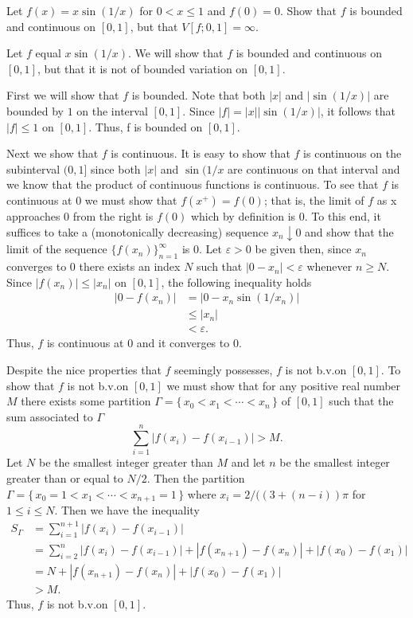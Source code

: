 \begin{problem}
  Let \(f(x)=x\sin(1/x)\) for \(0<x\leq 1\) and \(f(0)=0\). Show that \(f\) is
  bounded and continuous on \([0,1]\), but that \(V[f;0,1]=\infty\).
\end{problem}
\begin{solution}
  Let \(f\) equal \(x\sin(1/x)\). We will show that \(f\) is bounded and
  continuous on \([0,1]\), but that it is not of bounded variation on
  \([0,1]\).

  First we will show that \(f\) is bounded. Note that both \(|x|\) and
  \(|\sin(1/x)|\) are bounded by \(1\) on the interval \([0,1]\). Since
  \(|f|=|x||\sin(1/x)|\), it follows that \(|f|\leq 1\) on \([0,1]\). Thus, \(\)f
  is bounded on \([0,1]\).

  Next we show that \(f\) is continuous. It is easy to show that \(f\) is
  continuous on the subinterval \((0,1]\) since both \(|x|\) and \(\sin(1/x\)
  are continuous on that interval and we know that the product of
  continuous functions is continuous. To see that \(f\) is continuous at \(\)0
  we must show that \(f(x^+)=f(0)\); that is, the limit of \(f\) as \(\)x
  approaches \(0\) from the right is \(f(0)\) which by definition is \(0\). To
  this end, it suffices to take a (monotonically decreasing) sequence
  \(x_n\downarrow 0\) and show that the limit of the sequence
  \({\{f(x_n)\}}_{n=1}^\infty\) is \(0\). Let \(\varepsilon>0\) be given then,
  since \(x_n\) converges to \(0\) there exists an index \(N\) such that
  \(|0-x_n|<\varepsilon\) whenever \(n\geq N\). Since \(|f(x_n)|\leq |x_n|\) on
  \([0,1]\), the following inequality holds
  \begin{align*}
    |0-f(x_n)|
    &=\left|0-x_n\sin(1/x_n)\right|\\
    &\leq |x_n|\\
    &<\varepsilon.
  \end{align*}
  Thus, \(f\) is continuous at \(0\) and it converges to \(0\).

  Despite the nice properties that \(f\) seemingly possesses, \(f\) is not
  b.v.\@ on \([0,1]\). To show that \(f\) is not b.v.\@ on \([0,1]\) we
  must show that for any positive real number \(M\) there exists some
  partition \(\Gamma=\{\,x_0<x_1<\cdots<x_n\,\}\) of \([0,1]\) such that
  the sum associated to \(\Gamma\)
  \[
    \sum_{i=1}^n|f(x_i)-f(x_{i-1})|>M.
  \]
  Let \(N\) be the smallest integer greater than \(M\) and let \(n\) be the
  smallest integer greater than or equal to \(N/2\). Then the partition
  \(\Gamma=\{\,x_0=1<x_1<\cdots<x_{n+1}=1\,\}\) where \(x_i=2/((3+(n-i))\pi\)
  for \(1\leq i\leq N\). Then we have the inequality
  \begin{align*}
    S_\Gamma
    &=\sum_{i=1}^{n+1}|f(x_i)-f(x_{i-1})|\\
    &=\sum_{i=2}^n
      |f(x_i)-f(x_{i-1})|+|f(x_{n+1})-f(x_n)|+|f(x_0)-f(x_1)|\\
    &=N+|f(x_{n+1})-f(x_n)|+|f(x_0)-f(x_1)|\\
    &>M.
  \end{align*}
  Thus, \(f\) is not b.v.\@ on \([0,1]\).
\end{solution}

